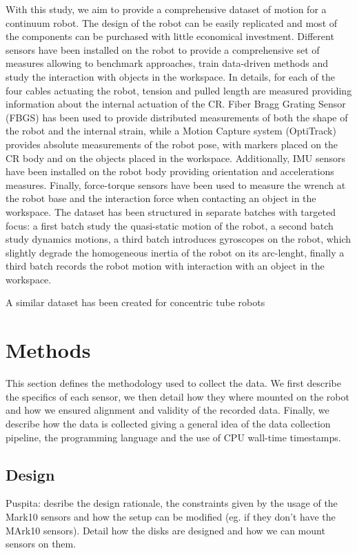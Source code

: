 \documentclass[14pt, a4paper]{article}
\begin{document}
With this study, we aim to provide a comprehensive dataset of motion for a continuum robot. The design of the robot can be easily replicated and most of the components can be purchased with little economical investment.
Different sensors have been installed on the robot to provide a comprehensive set of measures allowing to benchmark approaches, train data-driven methods and study the interaction with objects in the workspace.
In details, for each of the four cables actuating the robot, tension and pulled length are measured providing information about the internal actuation of the CR. Fiber Bragg Grating Sensor (FBGS) has been used to provide distributed measurements of both the shape of the robot and the internal strain, while a Motion Capture system (OptiTrack) provides absolute measurements of the robot pose, with markers placed on the CR body and on the objects placed in the workspace. 
Additionally, IMU sensors have been installed on the robot body providing orientation and accelerations measures.
Finally, force-torque sensors have been used to measure the wrench at the robot base and the interaction force when contacting an object in the workspace.
The dataset has been structured in separate batches with targeted focus: a first batch study the quasi-static motion of the robot, a second batch study dynamics motions, a third batch introduces gyroscopes on the robot, which slightly degrade the homogeneous inertia of the robot on its arc-lenght, finally a third batch records the robot motion with interaction with an object in the workspace.


A similar dataset has been created for concentric tube robots \cite{Grassmann2022}



\section{Methods}
This section defines the methodology used to collect the data.
We first describe the specifics of each sensor, we then detail how they where mounted on the robot and how we ensured alignment and validity of the recorded data.
Finally, we describe how the data is collected giving a general idea of the data collection pipeline, the programming language and the use of CPU wall-time timestamps. 

\subsection{Design}
Puspita: desribe the design rationale, the constraints given by the usage of the Mark10 sensors and how the setup can be modified (eg. if they don't have the MArk10 sensors).
Detail how the disks are designed and how we can mount sensors on them.
\end{document}
